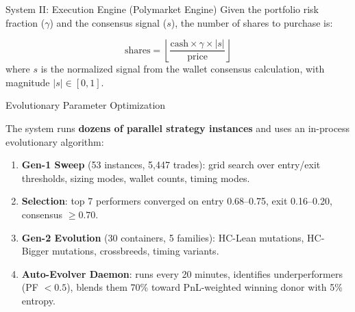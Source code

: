 \documentclass[final]{beamer}
\newlength{\colwidth}
\begin{document}
\begin{frame}[t]
\begin{columns}[t]
\begin{column}{\colwidth}
\begin{block}{System II: Execution Engine (Polymarket Engine)}
    Given the portfolio risk fraction ($\gamma$) and the consensus signal ($s$), the number of shares to purchase is:

    \[
      \text{shares} = \left\lfloor \frac{\text{cash} \times \gamma \times |s|}{\text{price}} \right\rfloor
    \]
    where $s$ is the normalized signal from the wallet consensus calculation, with magnitude $|s| \in [0, 1]$.



  \end{block}
  \begin{block}{Evolutionary Parameter Optimization}

    The system runs \textbf{dozens of parallel strategy instances} and uses an in-process evolutionary algorithm:

    \begin{enumerate}
      \setlength{\itemsep}{0pt}\setlength{\parsep}{0pt}
      \item \textbf{Gen-1 Sweep} (53 instances, 5{,}447 trades): grid search over entry/exit thresholds, sizing modes, wallet counts, timing modes.
      \item \textbf{Selection}: top 7 performers converged on entry 0.68--0.75, exit 0.16--0.20, consensus $\geq 0.70$.
      \item \textbf{Gen-2 Evolution} (30 containers, 5 families): HC-Lean mutations, HC-Bigger mutations, crossbreeds, timing variants.
      \item \textbf{Auto-Evolver Daemon}: runs every 20 minutes, identifies underperformers (PF $< 0.5$), blends them 70\% toward PnL-weighted winning donor with 5\% entropy. 
    \end{enumerate}


\end{block}
\end{column}
\end{columns}
\end{frame}
\end{document}
